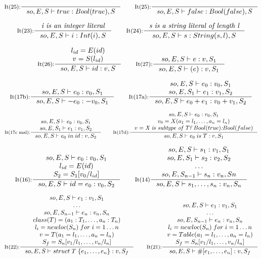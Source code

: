 \mathlig{->}{\rightarrow}
\mathlig{|-}{\vdash}
\mathlig{=>}{\Rightarrow}

\mathligson

\[
\inference[It(25):]{}{so, E, S|-true:Bool(true),S}
\quad\quad
\inference[It(25):]{}{so, E, S|-false:Bool(false),S}
\]

\[
\inference[It(23):]{\textit{i is an integer literal}}{so, E, S|-i:Int(i),S}
\quad\quad
\inference[It(24):]{\textit{s is a string literal of length l}}{so, E, S|-s:String(s,l),S}
\]

\[
\inference[It(26):]{
l_{id}=E(id) \\
v = S(l_{id})
}{so, E, S|-id:v,S}
\quad\quad
\inference[It(27):]{
so, E, S|-e:v,S_1
}
{so, E, S|-(e):v,S_1}
\]

\[
\inference[It(17b):]{
so, E, S|-e_0:v_0,S_1
}{so, E, S|--e_0:-v_0,S_1}
\quad\quad
\inference[It(17a):]{
so, E, S|-e_0:v_0,S_1 \\
so, E, S_1|-e_1:v_1,S_2
}{so, E, S|-e_0+e_1:v_0+v_1,S_2}
\]

\[
\inference[It(17c mal):]{
so, E, S|-e_0:v_0,S_1 \\
so, E, S_1|-e_1:v_1,S_2
}{so, E, S|-e_0 \; in \; id:v,S_2}
\quad\quad
\inference[It(17d):]{
so, E, S|-e_0:v_0,S_1 \\
v_0 = X(a_1=l_1, \ldots, a_n=l_n) \\
v = \textit{X is subtype of T?} \; Bool(true) \textit{:} Bool(false) \\
}{so, E, S|-e_0\; is \; T:v,S_1}
\]

\[
\inference[It(16):]
{
so,E,S|-e_0:v_0,S_1\\
l_{id} = E(id) \\
S_2 = S_1[v_0/l_{id}]
}
{so, E, S|-id = e_0:v_0, S_2}
\quad\quad
\inference[It(14)]
{
so, E, S|-s_1:v_1,S_1 \\
so, E, S_1|-s_2:v_2,S_2 \\
\dots \\
so, E, S_{n-1}|-s_n:v_n,Sn
}
{so, E, S|-s_1,\dots,s_n:v_n,S_n}
\]

\[
\inference[It(22):]
{
so,E,S|-e_1:v_1,S_1 \\
\ldots \\
so,E,S_{n-1}|-e_n:v_n,S_n \\
class(T)=(a_1:T_1, \ldots, a_n:T_n) \\  %
l_i = newloc(S_n) \; for \; i = 1 \ldots n \\
v=T(a_1=l_1, \ldots, a_n=l_n) \\ %
S_f = S_n[v_1/l_1, \ldots, v_n/l_n]
}
{so, E, S|-struct\;T\;\{ e_1, \ldots, e_n \}:v,S_f}
\quad\quad
\inference[It(21):]
{
so,E,S|-e_1:v_1,S_1 \\
\ldots \\
so,E,S_{n-1}|-e_n:v_n,S_n \\
l_i = newloc(S_n) \; for \; i = 1 \ldots n \\
v=Table(a_1=l_1, \ldots, a_n=l_n) \\
S_f = S_n[v_1/l_1, \ldots, v_n/l_n]
}
{so, E, S|-\#[e_1, \ldots, e_n]:v,S_f}
\]

